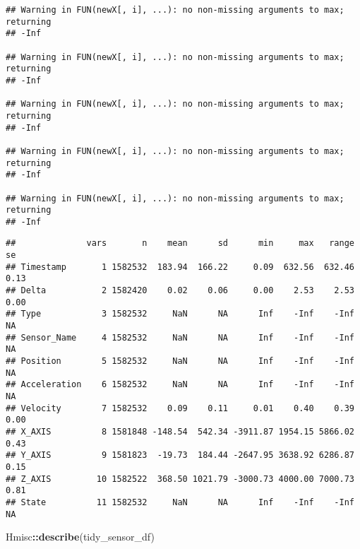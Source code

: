 \documentclass[]{article}
\newenvironment{Shaded}{\begin{snugshade}}{\end{snugshade}}
\newcommand{\KeywordTok}[1]{\textcolor[rgb]{0.13,0.29,0.53}{\textbf{#1}}}
\newcommand{\NormalTok}[1]{#1}
\newcommand{\OperatorTok}[1]{\textcolor[rgb]{0.81,0.36,0.00}{\textbf{#1}}}
\begin{document}
\begin{verbatim}
## Warning in FUN(newX[, i], ...): no non-missing arguments to max; returning
## -Inf

## Warning in FUN(newX[, i], ...): no non-missing arguments to max; returning
## -Inf

## Warning in FUN(newX[, i], ...): no non-missing arguments to max; returning
## -Inf

## Warning in FUN(newX[, i], ...): no non-missing arguments to max; returning
## -Inf

## Warning in FUN(newX[, i], ...): no non-missing arguments to max; returning
## -Inf
\end{verbatim}

\begin{verbatim}
##              vars       n    mean      sd      min     max   range   se
## Timestamp       1 1582532  183.94  166.22     0.09  632.56  632.46 0.13
## Delta           2 1582420    0.02    0.06     0.00    2.53    2.53 0.00
## Type            3 1582532     NaN      NA      Inf    -Inf    -Inf   NA
## Sensor_Name     4 1582532     NaN      NA      Inf    -Inf    -Inf   NA
## Position        5 1582532     NaN      NA      Inf    -Inf    -Inf   NA
## Acceleration    6 1582532     NaN      NA      Inf    -Inf    -Inf   NA
## Velocity        7 1582532    0.09    0.11     0.01    0.40    0.39 0.00
## X_AXIS          8 1581848 -148.54  542.34 -3911.87 1954.15 5866.02 0.43
## Y_AXIS          9 1581823  -19.73  184.44 -2647.95 3638.92 6286.87 0.15
## Z_AXIS         10 1582522  368.50 1021.79 -3000.73 4000.00 7000.73 0.81
## State          11 1582532     NaN      NA      Inf    -Inf    -Inf   NA
\end{verbatim}

\begin{Shaded}
\begin{Highlighting}[]
\NormalTok{Hmisc}\OperatorTok{::}\KeywordTok{describe}\NormalTok{(tidy_sensor_df)}
\end{Highlighting}
\end{Shaded}
\end{document}
